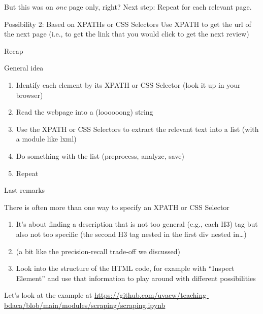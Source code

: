 \begin{frame}[fragile]{But this was on \emph{one} page only, right?}
  Next step: Repeat for each relevant page.
  
  \begin{block}{Possibility 2: Based on XPATHs or CSS Selectors}
    Use XPATH to get the url of the next page (i.e., to get the link that you would click to get the next review)
  \end{block}
	
\end{frame}


\begin{frame}{Recap}
\begin{block}{General idea}
\begin{enumerate}
\item Identify each element by its XPATH or CSS Selector (look it up in your browser) 
\item Read the webpage into a (loooooong) string
\item Use the XPATH  or CSS Selectors to extract the relevant text into a list (with a module like lxml)
\item Do something with the list (preprocess, analyze, save)
\item Repeat
\end{enumerate}
\end{block}
\end{frame}


\begin{frame}{Last remarks}
  \begin{block}{There is often more than one way to specify an XPATH or CSS Selector}
    \begin{enumerate}
    \item It's about finding a description that is not too general (e.g., each H3) tag but also not too specific (the second H3 tag nested in the first div nested in\ldots)
      \item (a bit like the precision-recall trade-off we discussed)
      \item Look into the structure of the HTML code, for example with ``Inspect Element'' and use that information to play around with different possibilities
    \end{enumerate}
  \end{block}
\end{frame}



\begin{frame}[standout]
Let's look at the example at \url{https://github.com/uvacw/teaching-bdaca/blob/main/modules/scraping/scraping.ipynb}
\end{frame}
